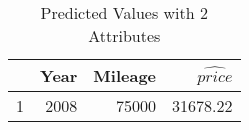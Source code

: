 \begin{table}[ht]
\centering
\begin{tabular}{rrrr}
  \hline
 & Year & Mileage & $\widehat{price}$ \\ 
  \hline
1 & 2008 & 75000 & 31678.22 \\ 
   \hline
\end{tabular}
\caption{Predicted Values with 2 Attributes} 
\label{tab:2p_predict}
\end{table}
